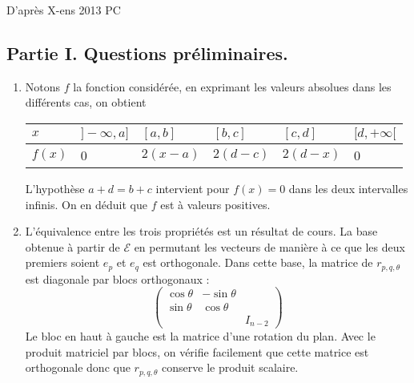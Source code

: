 D'après X-ens 2013 PC
\subsection*{Partie I. Questions préliminaires.}
\begin{enumerate}
 \item Notons $f$ la fonction considérée, en exprimant les valeurs absolues dans les différents cas, on obtient
\begin{center}
\renewcommand{\arraystretch}{1.4}
\begin{tabular}{|l|l|l|l|l|l|}
\hline
$x$    & $]-\infty , a ]$ & $[a,b]$  & $[b,c]$  & $[c,d]$  & $[d , +\infty[$ \\ \hline
$f(x)$ & 0                & $2(x-a)$ & $2(d-c)$ & $2(d-x)$ & 0 \\ \hline
\end{tabular}
\end{center}
L'hypothèse $a+d = b+c$ intervient pour $f(x)=0$ dans les deux intervalles infinis. On en déduit que $f$ est à valeurs positives.

 \item L'équivalence entre les trois propriétés est un résultat de cours. La base obtenue à partir de $\mathcal{E}$ en permutant les vecteurs de manière à ce que les deux premiers soient $e_p$ et $e_q$ est orthogonale. Dans cette base, la matrice de $r_{p,q,\theta}$ est diagonale par blocs orthogonaux :
\begin{displaymath}
 \begin{pmatrix}
  \cos \theta & -\sin \theta &  \\
  \sin \theta & \cos \theta &  \\
   & & I_{n-2}
 \end{pmatrix}
\end{displaymath}
Le bloc en haut à gauche est la matrice d'une rotation du plan. Avec le produit matriciel par blocs, on vérifie facilement que cette matrice est orthogonale donc que $r_{p,q,\theta}$ conserve le produit scalaire.
\end{enumerate}


